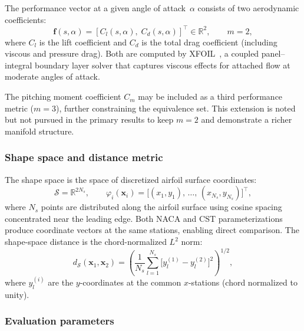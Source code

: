 The performance vector at a given angle of attack~$\alpha$ consists of two aerodynamic coefficients:
\begin{equation}
    \mathbf{f}(s, \alpha) = [C_l(s, \alpha),\; C_d(s, \alpha)]^\top \in \mathbb{R}^2, \qquad m = 2,
    \label{eq:airfoil_perf}
\end{equation}
where $C_l$ is the lift coefficient and $C_d$ is the total drag coefficient (including viscous and pressure drag). Both are computed by XFOIL~\citep{drela1989xfoil}, a coupled panel--integral boundary layer solver that captures viscous effects for attached flow at moderate angles of attack.

\begin{remark}
The pitching moment coefficient $C_m$ may be included as a third performance metric ($m = 3$), further constraining the equivalence set. This extension is noted but not pursued in the primary results to keep $m = 2$ and demonstrate a richer manifold structure.
\end{remark}

\subsubsection{Shape space and distance metric}

The shape space is the space of discretized airfoil surface coordinates:
\begin{equation}
    \mathcal{S} = \mathbb{R}^{2N_s}, \qquad
    \varphi_i(\mathbf{x}_i) = \bigl[(x_1, y_1),\, \ldots,\, (x_{N_s}, y_{N_s})\bigr]^\top,
\end{equation}
where $N_s$ points are distributed along the airfoil surface using cosine spacing concentrated near the leading edge. Both NACA and CST parameterizations produce coordinate vectors at the same stations, enabling direct comparison. The shape-space distance is the chord-normalized $L^2$ norm:
\begin{equation}
    d_{\mathcal{S}}(\mathbf{x}_1, \mathbf{x}_2)
    = \left( \frac{1}{N_s} \sum_{l=1}^{N_s}
    \bigl[ y_l^{(1)} - y_l^{(2)} \bigr]^2 \right)^{1/2},
    \label{eq:airfoil_distance}
\end{equation}
where $y_l^{(i)}$ are the $y$-coordinates at the common $x$-stations (chord normalized to unity).


\subsubsection{Evaluation parameters}

